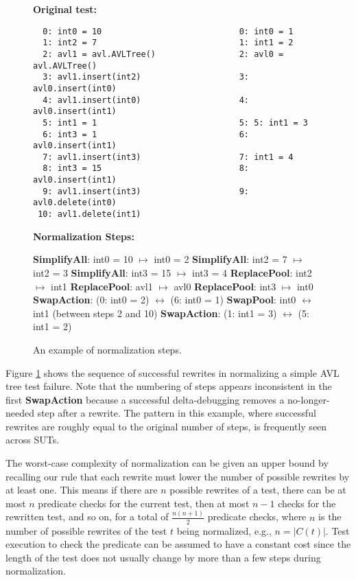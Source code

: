 \begin{figure}
{\scriptsize
{\bf Original test:}\hspace{0.83in}{\bf Normalized:}
\begin{verbatim}
  0: int0 = 10                            0: int0 = 1
  1: int2 = 7                             1: int1 = 2
  2: avl1 = avl.AVLTree()                 2: avl0 = avl.AVLTree()
  3: avl1.insert(int2)                    3: avl0.insert(int0) 
  4: avl1.insert(int0)                    4: avl0.insert(int1) 
  5: int1 = 1                             5: 5: int1 = 3
  6: int3 = 1                             6: avl0.insert(int1) 
  7: avl1.insert(int3)                    7: int1 = 4
  8: int3 = 15                            8: avl0.insert(int1)
  9: avl1.insert(int3)                    9: avl0.delete(int0)
 10: avl1.delete(int1) 
\end{verbatim}
{\bf Normalization Steps:}
\begin{code}
{\bf SimplifyAll}: int0 = 10 $\mapsto$ int0 = 2 
{\bf SimplifyAll}: int2 = 7  $\mapsto$ int2 = 3 
{\bf SimplifyAll}: int3 = 15  $\mapsto$ int3 = 4 
{\bf ReplacePool}: int2 $\mapsto$ int1
{\bf ReplacePool}: avl1 $\mapsto$ avl0
{\bf ReplacePool}: int3 $\mapsto$ int0
{\bf SwapAction}: (0: int0 = 2)  $\leftrightarrow$ (6: int0 = 1)
{\bf SwapPool}: int0 $\leftrightarrow$ int1 (between steps 2 and 10)
{\bf SwapAction}: (1: int1 = 3)  $\leftrightarrow$ (5: int1 = 2)
\end{code}
}
\caption{An example of normalization steps.}
\label{diffnorm}
\end{figure}

Figure \ref{diffnorm} shows the sequence of successful rewrites in
normalizing a simple AVL tree test failure.  Note that the numbering
of steps appears inconsistent in the first {\bf SwapAction} because a
successful delta-debugging removes a no-longer-needed step after a
rewrite.  The pattern in this example, where successful rewrites
are roughly equal to the original number of steps, is frequently seen across SUTs.

The worst-case complexity of normalization can be given an upper bound by recalling our
rule that each rewrite must lower the number of possible rewrites by
at least one.  This means if there are $n$ possible rewrites of a
test, there can be at most $n$ predicate checks for the current test,
then at most $n-1$ checks for the rewritten test, and so on, for
a total of $\frac{n(n+1)}{2}$ predicate checks, where $n$ is the
number of possible rewrites of the test $t$ being normalized, e.g.,
$n = |C(t)|$.  Test execution to check the predicate can be
assumed to have a constant cost since the length of the test does
not usually change by more than a few steps during normalization. 

